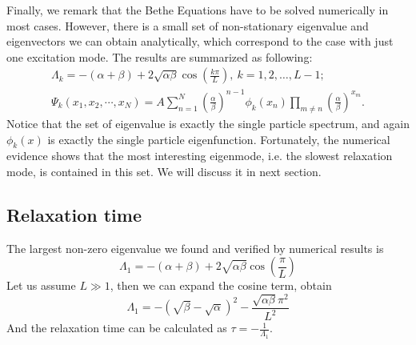 Finally, we remark that the Bethe Equations have to be solved numerically in most cases. However, there is a small set of non-stationary eigenvalue and eigenvectors we can obtain analytically, which correspond to the case with just one excitation mode. The results are summarized as following:  
\begin{subequations}
    \label{eq:eigenN}
    \begin{align}
        \label{eq:partEigenvaluesN}
        \Lambda_k  = -(\alpha+\beta) + 2\sqrt{\alpha\beta}\cos(\frac{k\pi}{L}), ~k=1,2,\dots, L-1; \\
        \label{eq:eigenvectorsN}
        \Psi_k(x_1, x_2, \cdots, x_N)  =  A \sum_{n=1}^N \left(\frac{\alpha}{\beta}\right)^{n-1} \phi_k(x_n)\prod_{m\neq n} \left(\frac{\alpha}{\beta}\right)^{x_m}.
    \end{align}
\end{subequations}
Notice that the set of eigenvalue is exactly the single particle spectrum, and again $\phi_k(x)$ is exactly the single particle eigenfunction.
Fortunately, the numerical evidence shows that the most interesting eigenmode, i.e. the slowest relaxation mode, is contained in this set.  We will discuss it in next section. 

\subsection{Relaxation time}
\label{sub:relaxation_time}

The largest non-zero eigenvalue we found and verified by numerical results is 
\begin{equation}
    \label{eq:largestEigenvalue}
    \Lambda_1 = -(\alpha+\beta) + 2\sqrt{\alpha\beta}\cos(\frac{\pi}{L})
\end{equation}
Let us assume $L \gg 1$, then we can expand the cosine term, obtain 
\begin{equation}
    \label{eq:largestEigenvalueExpanded}
    \Lambda_1 = -(\sqrt{\beta}-\sqrt{\alpha})^2 -
    \frac{\sqrt{\alpha\beta}\pi^2}{L^2}
\end{equation}
And the relaxation time can be calculated as $\tau = -\frac{1}{\Lambda_1}$.

